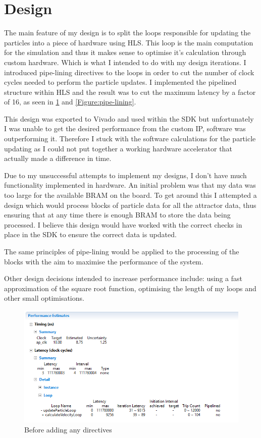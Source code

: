 \documentclass[12pt]{article} %
\begin{document}
\section{Design} %


The main feature of my design is to split the loops responsible for updating the particles into a piece of hardware using HLS. This loop is the main computation for the simulation and thus it makes sense to optimise it's calculation through custom hardware. Which is what I intended to do with my design iterations. I introduced pipe-lining directives to the loops in order to cut the number of clock cycles needed to perform the particle updates. I implemented the pipelined structure within HLS and the result was to cut the maximum latency by a factor of 16, as seen in \cref{Figure:default} and \cref{Figure:pipe-lining}.
	
This design was exported to Vivado and used within the SDK but unfortunately I was unable to get the desired performance from the custom IP, software was outperforming it. Therefore I stuck with the software calculations for the particle updating as I could not put together a working hardware accelerator that actually made a difference in time.

Due to my unsuccessful attempts to implement my designs, I don't have much functionality implemented in hardware. An initial problem was that my data was too large for the available BRAM on the board. To get around this I attempted a design which would process blocks of particle data for all the attractor data, thus ensuring that at any time there is enough BRAM to store the data being processed. I believe this design would have worked with the correct checks in place in the SDK to ensure the correct data is updated.

The same principles of pipe-lining would be applied to the processing of the blocks with the aim to maximise the performance of the system.
	
Other design decisions intended to increase performance include: using a fast approximation of the square root function, optimising the length of my loops and other small optimisations.
	
\begin{figure}[h!]
  \centering
  \includegraphics[width=\linewidth]{figures/default.jpg}
  \caption{Before adding any directives}
  \label{Figure:default}
\end{figure}
	
\end{document}
